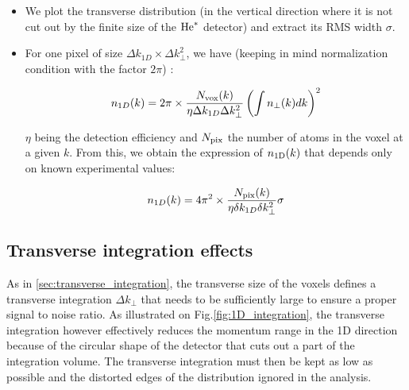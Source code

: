 \begin{itemize}
    \item We plot the transverse distribution (in the vertical direction where it is not cut out by the finite size of the $\mathrm{He}^*$ detector) and extract its RMS width $\sigma$. 
    \item For one pixel of size $\Delta k_{1D} \times \Delta k_{\perp}^2$, we have (keeping in mind normalization condition with the factor $2\pi$) :
    

    \begin{align}
        n_{1D}(k) &= 2\pi \times \frac{N_{\rm{vox}}(k)}{\eta \Delta k_{1D} \Delta k_{\perp}^2} \left(\int n_{\perp}(k) dk \right)^2 \\
    \end{align}
    
    \noindent $\eta$ being the detection efficiency and $N_{\rm{pix}}$ the number of atoms in the voxel at a given $k$. From this, we obtain the expression of $n_{\rm{1D}}(k)$ that depends only on known experimental values:
    
    \begin{equation}
        n_{1D}(k) = 4\pi^2 \times \frac{N_{\rm{pix}}(k)}{\eta \delta k_{1D} \delta k_{\perp}^2} \sigma 
    \end{equation}

    

\end{itemize}

\subsection{Transverse integration effects}

As in \ref{sec:transverse_integration}, the transverse size of the voxels defines a transverse integration $\Delta k_{\perp}$ that needs to be sufficiently large  to ensure a proper signal to noise ratio. As illustrated on Fig.\ref{fig:1D_integration}, the transverse integration however effectively reduces the momentum range in the 1D direction because of the circular shape of the detector that cuts out a part of the integration volume. The transverse integration must then be kept as low as possible and the distorted edges of the distribution ignored in the analysis. 

